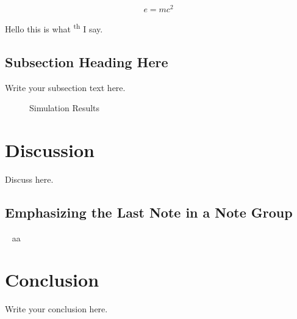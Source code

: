 \documentclass[a4paper]{article}
\begin{document}
\begin{equation}
\label{einstein}
e=mc^2
\end{equation}

Hello this is what  \textsuperscript{th} I say.


\subsection{Subsection Heading Here}
Write your subsection text here.

\begin{figure}
    \centering
    \caption{Simulation Results}
    \label{simulationfigure}
\end{figure}

\section{Discussion}
Discuss here.

\subsection{Emphasizing the Last Note in a Note Group}



~\newline
aa












\section{Conclusion}
Write your conclusion here.
\end{document}
